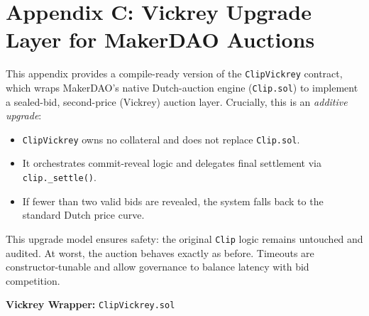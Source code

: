\documentclass[11pt]{article}
\begin{document}
\clearpage
\section*{Appendix C: Vickrey Upgrade Layer for MakerDAO Auctions}

This appendix provides a compile-ready version of the \texttt{ClipVickrey} contract, which wraps MakerDAO's native Dutch-auction engine (\texttt{Clip.sol}) \parencite{makerdao-clip-docs} to implement a sealed-bid, second-price (Vickrey) auction layer. Crucially, this is an \emph{additive upgrade}:
\begin{itemize}
  \item \texttt{ClipVickrey} owns no collateral and does not replace \texttt{Clip.sol}.
  \item It orchestrates commit-reveal logic and delegates final settlement via \texttt{clip.\_settle()}.
  \item If fewer than two valid bids are revealed, the system falls back to the standard Dutch price curve.
\end{itemize}
This upgrade model ensures safety: the original \texttt{Clip} logic remains untouched and audited. At worst, the auction behaves exactly as before. Timeouts are constructor-tunable and allow governance to balance latency with bid competition.

\bigskip

\noindent\textbf{Vickrey Wrapper:} \texttt{ClipVickrey.sol}
\end{document}
